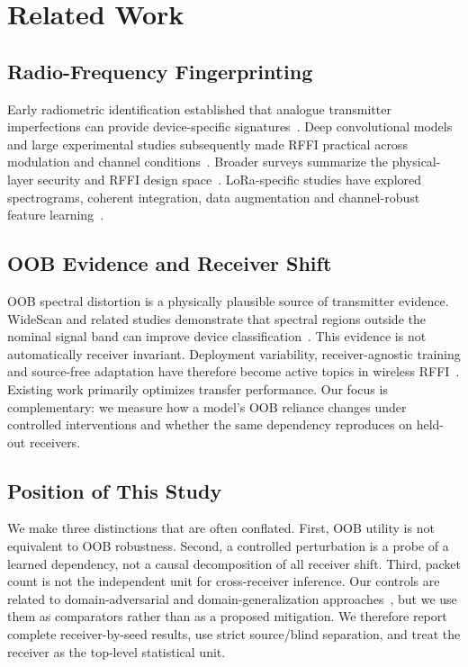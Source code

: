 \section{Related Work}
\label{sec:related}
\subsection{Radio-Frequency Fingerprinting}
Early radiometric identification established that analogue transmitter imperfections can provide device-specific signatures~\cite{brik2008wireless_device_id}. Deep convolutional models and large experimental studies subsequently made RFFI practical across modulation and channel conditions~\cite{riyaz2018deep_cnn_radio_id,sankhe2019oracle,jian2020deeplearning_rf_fingerprinting}. Broader surveys summarize the physical-layer security and RFFI design space~\cite{xu2015device_fingerprinting_survey,xie2021physical_layer_auth_survey,xie2024rffi_iot_survey,ahmed2024lora_rffi_survey}. LoRa-specific studies have explored spectrograms, coherent integration, data augmentation and channel-robust feature learning~\cite{shen2021lora_jsac,shen2022scalable_lora_rffi,xie2018coherent_rff_iotj,alshawabka2021deeplora,hamdaoui2022deeplearning}.

\subsection{OOB Evidence and Receiver Shift}
OOB spectral distortion is a physically plausible source of transmitter evidence. WideScan and related studies demonstrate that spectral regions outside the nominal signal band can improve device classification~\cite{elmaghbub2020widescan,hamdaoui2020deep_nn_features,alshawabka2020exposing_fingerprint}. This evidence is not automatically receiver invariant. Deployment variability, receiver-agnostic training and source-free adaptation have therefore become active topics in wireless RFFI~\cite{elmaghbub2021lora_wild,shen2024receiveragnostic,ma2025receiver_independent_rffi,yang2025scrffi,yang2024cross_receiver_da,ma2025cross_receiver_disentangle}. Existing work primarily optimizes transfer performance. Our focus is complementary: we measure how a model's OOB reliance changes under controlled interventions and whether the same dependency reproduces on held-out receivers.

\subsection{Position of This Study}
We make three distinctions that are often conflated. First, OOB utility is not equivalent to OOB robustness. Second, a controlled perturbation is a probe of a learned dependency, not a causal decomposition of all receiver shift. Third, packet count is not the independent unit for cross-receiver inference. Our controls are related to domain-adversarial and domain-generalization approaches~\cite{ganin2016domain_adversarial,sun2016deepcoral,ben2010domain_adaptation}, but we use them as comparators rather than as a proposed mitigation. We therefore report complete receiver-by-seed results, use strict source/blind separation, and treat the receiver as the top-level statistical unit.
